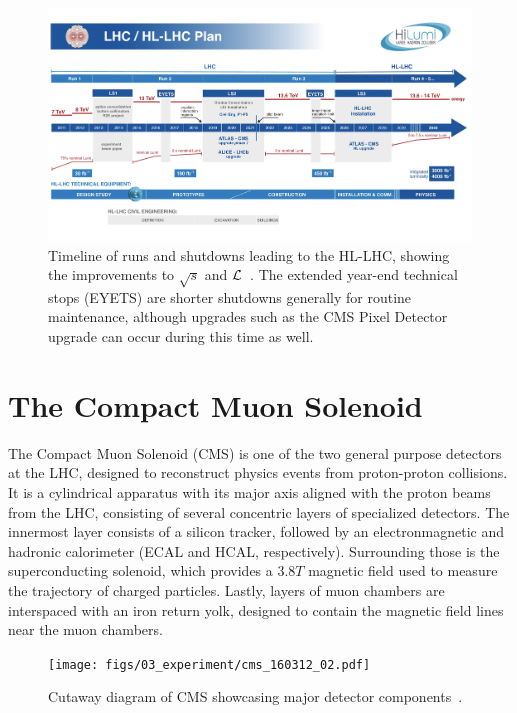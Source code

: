 \begin{figure} [htbp]
	\centering
	\includegraphics[width=0.84\linewidth]{figs/03_experiment/HLLHCTIMELINE_0.png}
	\caption[Timeline of runs and shutdowns leading to the HL-LHC, showing the improvements to $\sqrt{s}$ and $\lumi$. The extended year-end technical stops (EYETS) are shorter shutdowns generally for routine maintenance, although upgrades such as the CMS Pixel Detector upgrade can occur during this time as well.]{Timeline of runs and shutdowns leading to the HL-LHC, showing the improvements to $\sqrt{s}$ and $\lumi$~\cite{HLLHC_timeline}. The extended year-end technical stops (EYETS) are shorter shutdowns generally for routine maintenance, although upgrades such as the CMS Pixel Detector upgrade can occur during this time as well.}
	\label{fig:HLLHC}
\end{figure}

\section{The Compact Muon Solenoid} \label{sec:CMS}
The Compact Muon Solenoid (CMS) is one of the two general purpose detectors at the LHC, designed to reconstruct physics events from proton-proton collisions. It is a cylindrical apparatus with its major axis aligned with the proton beams from the LHC, consisting of several concentric layers of specialized detectors. The innermost layer consists of a silicon tracker, followed by an electronmagnetic and hadronic calorimeter (ECAL and HCAL, respectively). Surrounding those is the superconducting solenoid, which provides a $3.8\unit{T}$ magnetic field used to measure the trajectory of charged particles. Lastly, layers of muon chambers are interspaced with an iron return yolk, designed to contain the magnetic field lines near the muon chambers.

\begin{figure}[htbp]
	\centering
	\texttt{[image: figs/03\_experiment/cms\_160312\_02.pdf]}
	\caption[Cutaway diagram of CMS showcasing major detector components.]
			{Cutaway diagram of CMS showcasing major detector components~\cite{Sakuma:2665537}.}
	\label{fig:CMS}
\end{figure}

